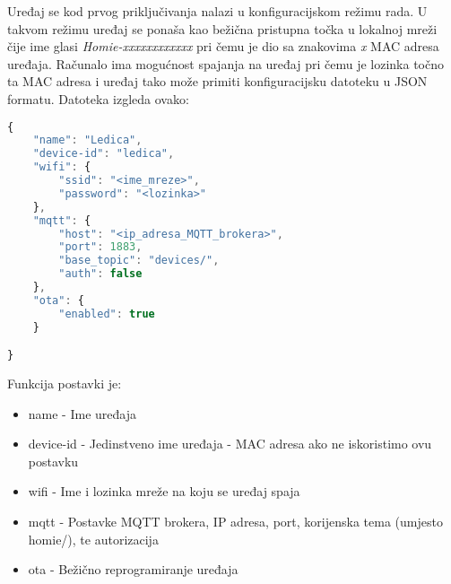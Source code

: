 \documentclass[times, utf8, zavrsni]{fer}
\begin{document}
{Uređaj se kod prvog priključivanja nalazi u konfiguracijskom režimu rada.
U takvom režimu uređaj se ponaša kao bežična pristupna točka u lokalnoj mreži čije ime glasi \textit{Homie-xxxxxxxxxxxx} pri čemu je dio sa znakovima \textit{x} MAC adresa uređaja.
Računalo ima mogućnost spajanja na uređaj pri čemu je lozinka točno ta MAC adresa i uređaj tako može primiti konfiguracijsku datoteku u JSON formatu.
Datoteka izgleda ovako:
\begin{lstlisting}[language=JavaScript]
{
    "name": "Ledica",
    "device-id": "ledica",
    "wifi": {
        "ssid": "<ime_mreze>",
        "password": "<lozinka>"
    },
    "mqtt": {
        "host": "<ip_adresa_MQTT_brokera>",
        "port": 1883,
        "base_topic": "devices/",
        "auth": false
    },
    "ota": {
        "enabled": true
    }

}
\end{lstlisting}
Funkcija postavki je:
\begin{itemize}
    \item name - Ime uređaja
    \item device-id - Jedinstveno ime uređaja - MAC adresa ako ne iskoristimo ovu postavku
    \item wifi - Ime i lozinka mreže na koju se uređaj spaja
    \item mqtt - Postavke MQTT brokera, IP adresa, port, korijenska tema (umjesto homie/), te autorizacija
    \item ota - Bežično reprogramiranje uređaja
\end{itemize}

}
\end{document}
